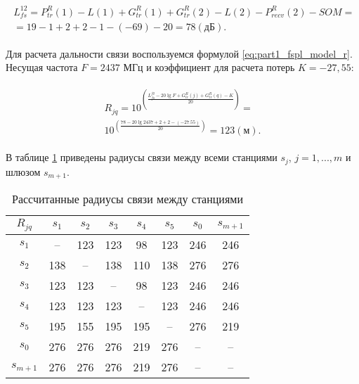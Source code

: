 \begin{align}
  \begin{aligned}
  L_{fs}^{12} = P_{tr}^R(1) - L(1) + G_{tr}^R(1) + G_{tr}^R(2) - L(2) - P_{recv}^R(2) - SOM = \\
  = 19 - 1 + 2 + 2 - 1 - (-69) - 20  = 78 (\text{дБ}).
  \end{aligned}
\end{align}

Для расчета дальности связи воспользуемся формулой \cref{eq:part1_fspl_model_r}. Несущая частота $ F = 2437 $ МГц и коэффициент для расчета потерь $ K = -27,55 $:


\begin{align}
  \begin{aligned}
  R_{jq} = 10^{\left(\frac{L_{fs}^{jq} - 20\lg{F} + G_{tr}^R(j) + G_{tr}^R(q) - K}{20}\right)}
  = \\ 10^{\left(\frac{78 - 20\lg{2437} + 2 + 2 - (-27.55)}{20}\right)} = 123 (\text{м}).
  \end{aligned}
\end{align}

В таблице \cref{tab:part4_Rjq_mip} приведены радиусы связи между всеми станциями $ s_j $, $ j = 1, ..., m $ и шлюзом $ s_ {m + 1} $.

\begin{table}[h!]\centering
  \begin{tabular}{|c||c|c|c|c|c|c|c|}\hline
      $R_{jq}$ & $s_1$ & $s_2$ & $s_3$ & $s_4$ & $s_5$ & $s_{0}$ & $s_{m+1}$ \\ \hline \hline

      $s_1$ &--& 123& 123& 98& 123& 246& 246\\ 
      $s_2$ &138& --& 138& 110& 138& 276& 276\\ 
      $s_3$ &123& 123& --& 98& 123& 246& 246\\ 
      $s_4$ &123& 123& 123& --& 123& 246& 246\\ 
      $s_5$ &195& 155& 195& 195& --& 276& 219\\ 
      $s_{0}$ &276& 276& 276& 219& 276& --& --\\
      $s_{m+1}$ &276& 276& 276& 219& 276& --& --\\  
      \hline

\end{tabular}\caption{Рассчитанные радиусы связи между станциями}\label{tab:part4_Rjq_mip}
\end{table}

